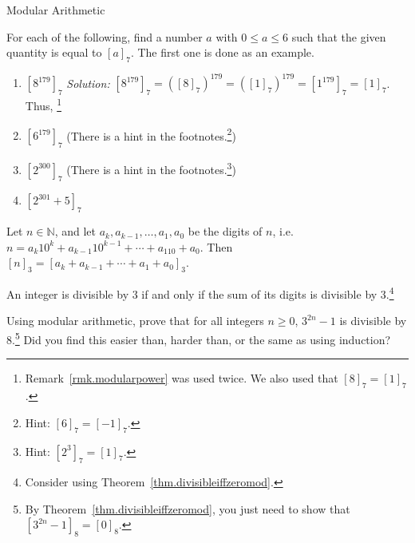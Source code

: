 \begin{section}{Modular Arithmetic}
\begin{problem}
For each of the following, find a number $a$ with $0\le a \le 6$ such that the given quantity is equal to $[a]_7$. The first one is done as an example.
\begin{enumerate}[label=\textrm{(\alph*)}]
\item $[8^{179}]_7$
 \quad\textit{Solution:}  $[8^{179}]_7 = ([8]_7)^{179} =  ([1]_7)^{179} =  [1^{179}]_7 = [1]_7$. Thus,  \footnote{Remark~\ref{rmk.modularpower} was used twice. We also used that  $[8]_7 = [1]_7$.}
\item $[6^{179}]_7$ \quad(There is a hint in the footnotes.\footnote{Hint:  $[6]_7 = [-1]_7$.})
\item $[2^{300}]_7$ \quad(There is a hint in the footnotes.\footnote{Hint:  $[2^3]_7 = [1]_7$.})
\item $[2^{301} +5]_7$
\end{enumerate}
\end{problem}

\begin{theorem}
Let $n\in \mathbb{N}$, and let $a_k, a_{k-1}, \ldots, a_1, a_0$ be the digits of $n$, i.e. $n=a_k10^k + a_{k-1}10^{k-1} + \cdots + a_110 + a_0$. Then $[n]_3 =  [a_k + a_{k-1} + \cdots + a_1 + a_0]_3$.
\end{theorem}

\begin{theorem}
An integer is divisible by $3$ if and only if the sum of its digits is divisible by $3$.\footnote{Consider using Theorem~\ref{thm.divisibleiffzeromod}.}
\end{theorem}

\begin{problem}
Using modular arithmetic, prove that for all integers $n \ge 0$, $3^{2n}-1$ is divisible by $8$.\footnote{By Theorem~\ref{thm.divisibleiffzeromod}, you just need to show that $[3^{2n}-1]_8 = [0]_8$.} Did you find this easier than, harder than, or the same as using induction?
\end{problem}

\end{section}
